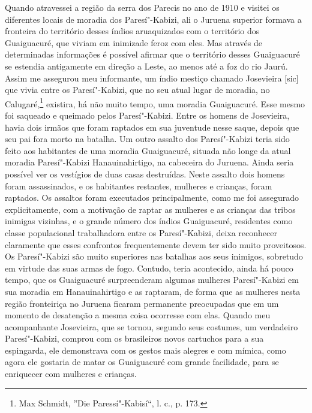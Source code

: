 Quando atravessei a região da serra dos Parecis no ano de 1910 e visitei
os diferentes locais de moradia dos Paresí"-Kabizi, ali o Juruena
superior formava a fronteira do território desses índios aruaquizados
com o território dos Guaiguacuré, que viviam em inimizade feroz com
eles. Mas através de determinadas informações é possível afirmar que o
território desses Guaiguacuré se estendia antigamente em direção a
Leste, ao menos até a foz do rio Jaurú. Assim me assegurou meu
informante, um índio mestiço chamado Josevieira {[}sic{]} que vivia
entre os Paresí"-Kabizi, que no seu atual lugar de moradia, no
Calugaré,\footnote{Max Schmidt, ''Die Paressí"-Kabisí``, l. c., p. 173.}
existira, há não muito tempo, uma moradia Guaiguacuré. Esse mesmo foi
saqueado e queimado pelos Paresí"-Kabizi. Entre os homens de Josevieira,
havia dois irmãos que foram raptados em sua juventude nesse saque,
depois que seu pai fora morto na batalha. Um outro assalto dos
Paresí"-Kabizi teria sido feito aos habitantes de uma moradia
Guaiguacuré, situada não longe da atual moradia Paresí"-Kabizi
Hanauinahirtigo, na cabeceira do Juruena. Ainda seria possível ver os
vestígios de duas casas destruídas. Neste assalto dois homens foram
assassinados, e os habitantes restantes, mulheres e crianças, foram
raptados. Os assaltos foram executados principalmente, como me foi
assegurado explicitamente, com a motivação de raptar as mulheres e as
crianças das tribos inimigas vizinhas, e o grande número dos índios
Guaiguacuré, residentes como classe populacional trabalhadora entre os
Paresí"-Kabizi, deixa reconhecer claramente que esses confrontos
frequentemente devem ter sido muito proveitosos. Os Paresí"-Kabizi são
muito superiores nas batalhas aos seus inimigos, sobretudo em virtude
das suas armas de fogo. Contudo, teria acontecido, ainda há pouco
tempo, que os Guaiguacuré surpreenderam algumas mulheres Paresí"-Kabizi
em sua moradia em Hanauinahirtigo e as raptaram, de forma que as
mulheres nesta região fronteiriça no Juruena ficaram permanente
preocupadas que em um momento de desatenção a mesma coisa ocorresse com
elas. Quando meu acompanhante Josevieira, que se tornou, segundo seus
costumes, um verdadeiro Paresí"-Kabizi, comprou com os brasileiros novos
cartuchos para a sua espingarda, ele demonstrava com os gestos mais
alegres e com mímica, como agora ele gostaria de matar os Guaiguacuré
com grande facilidade, para se enriquecer com mulheres e crianças.

